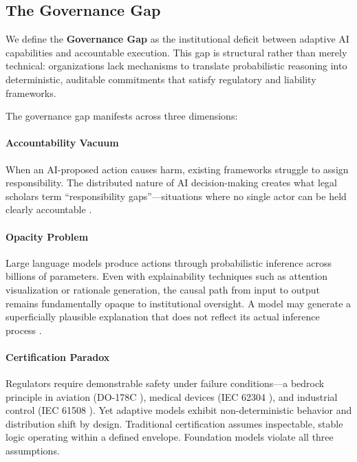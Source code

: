 \documentclass[sigconf,nonacm]{acmart}
\begin{document}
\subsection{The Governance Gap}

We define the \textbf{Governance Gap} as the institutional deficit between adaptive AI capabilities and accountable execution. This gap is structural rather than merely technical: organizations lack mechanisms to translate probabilistic reasoning into deterministic, auditable commitments that satisfy regulatory and liability frameworks.

The governance gap manifests across three dimensions:

\paragraph{Accountability Vacuum} When an AI-proposed action causes harm, existing frameworks struggle to assign responsibility. The distributed nature of AI decision-making creates what legal scholars term ``responsibility gaps''---situations where no single actor can be held clearly accountable \cite{diakopoulos2016accountability}.

\paragraph{Opacity Problem} Large language models produce actions through probabilistic inference across billions of parameters. Even with explainability techniques such as attention visualization or rationale generation, the causal path from input to output remains fundamentally opaque to institutional oversight. A model may generate a superficially plausible explanation that does not reflect its actual inference process \cite{bommasani2021opportunities}.

\paragraph{Certification Paradox} Regulators require demonstrable safety under failure conditions---a bedrock principle in aviation (DO-178C \cite{rtca2011do178c}), medical devices (IEC 62304 \cite{iec62304}), and industrial control (IEC 61508 \cite{iec61508}). Yet adaptive models exhibit non-deterministic behavior and distribution shift by design. Traditional certification assumes inspectable, stable logic operating within a defined envelope. Foundation models violate all three assumptions.
\end{document}

